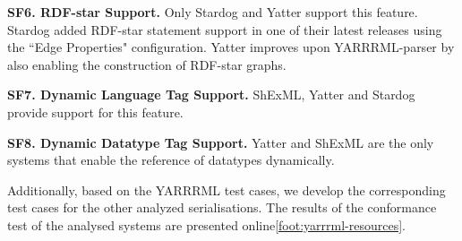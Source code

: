 \textbf{SF6. RDF-star Support.}
Only Stardog and Yatter support this feature. 
Stardog added RDF-star statement support in one of their latest releases using the ``Edge Properties" configuration.
Yatter improves upon YARRRML-parser by also enabling the construction of RDF-star graphs.

\textbf{SF7. Dynamic Language Tag Support.} %
ShExML, Yatter and Stardog 
 provide support for this feature. 

\textbf{SF8. Dynamic Datatype Tag Support.} %
Yatter and ShExML are the only systems that enable the reference of datatypes dynamically. 

Additionally, based on the YARRRML test cases, we develop the corresponding test cases for the other analyzed serialisations. The results of the conformance test of the analysed systems are presented online\cref{foot:yarrrml-resources}.


